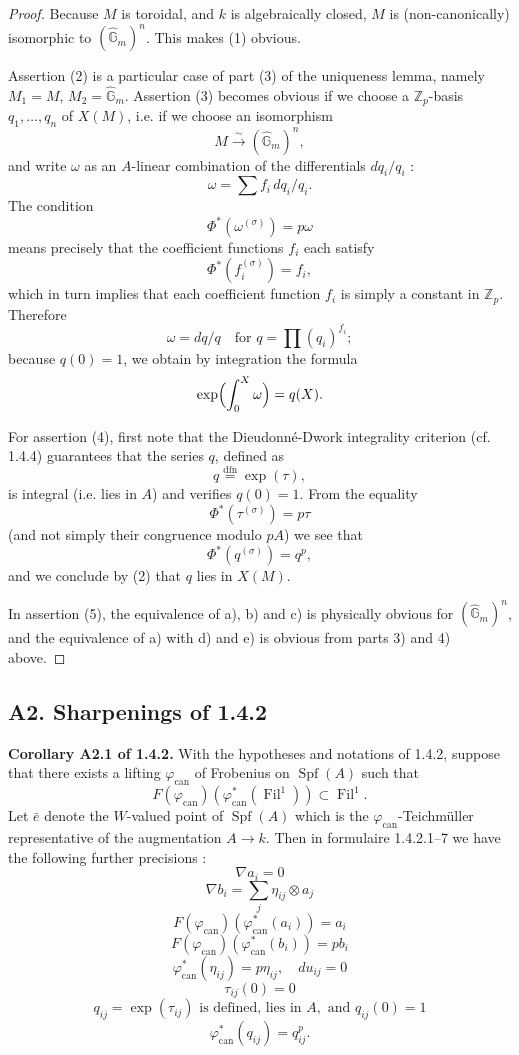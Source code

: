 \documentclass[12pt,a4paper]{article}
\theoremstyle{plain}
\theoremstyle{definition}
\theoremstyle{remark}
\DeclareMathOperator{\Fil}{Fil}
\DeclareMathOperator{\Spf}{Spf}
\begin{document}
\begin{proof}
Because $M$ is toroidal, and $k$ is algebraically closed, $M$ is (non-canonically) isomorphic to $(\hat{\mathbb{G}}_m)^n$. This makes (1) obvious.

Assertion (2) is a particular case of part (3) of the uniqueness lemma, namely $M_1 = M$, $M_2 = \hat{\mathbb{G}}_m$. Assertion (3) becomes obvious if we choose a $\mathbb{Z}_p$-basis $q_1, \ldots, q_n$ of $X(M)$, i.e. if we choose an isomorphism
\[
M \xrightarrow{\sim} (\hat{\mathbb{G}}_m)^n,
\]
and write $\omega$ as an $A$-linear combination of the differentials $dq_i/q_i$ :
\[
\omega = \sum f_i \, dq_i/q_i.
\]
The condition
\[
\Phi^*(\omega^{(\sigma)}) = p\omega
\]
means precisely that the coefficient functions $f_i$ each satisfy
\[
\Phi^*(f_i^{(\sigma)}) = f_i,
\]
which in turn implies that each coefficient function $f_i$ is simply a constant in $\mathbb{Z}_p$. Therefore
\[
\omega = dq/q \quad \text{for } q = \prod (q_i)^{f_i};
\]
because $q(0) = 1$, we obtain by integration the formula
\[
\exp\Bigl(\int_0^X \omega\Bigr) = q(X).
\]

For assertion (4), first note that the Dieudonn\'e-Dwork integrality criterion (cf. 1.4.4) guarantees that the series $q$, defined as
\[
q \overset{\mathrm{dfn}}{=} \exp(\tau),
\]
is integral (i.e. lies in $A$) and verifies $q(0) = 1$. From the equality
\[
\Phi^*(\tau^{(\sigma)}) = p\tau
\]
(and not simply their congruence modulo $pA$) we see that
\[
\Phi^*(q^{(\sigma)}) = q^p,
\]
and we conclude by (2) that $q$ lies in $X(M)$.

In assertion (5), the equivalence of a), b) and c) is physically obvious for $(\hat{\mathbb{G}}_m)^n$, and the equivalence of a) with d) and e) is obvious from parts 3) and 4) above. \qedhere
\end{proof}

\subsection*{A2. Sharpenings of 1.4.2}

\textbf{Corollary A2.1 of 1.4.2.} With the hypotheses and notations of 1.4.2, suppose that there exists a lifting $\varphi_{\mathrm{can}}$ of Frobenius on $\Spf(A)$ such that
\[
F(\varphi_{\mathrm{can}})(\varphi_{\mathrm{can}}^*(\Fil^1)) \subset \Fil^1.
\]
Let $\bar{e}$ denote the $W$-valued point of $\Spf(A)$ which is the $\varphi_{\mathrm{can}}$-Teichm\"uller representative of the augmentation $A \to k$. Then in formulaire 1.4.2.1--7 we have the following further precisions :
\[
\nabla a_i = 0
\]
\[
\nabla b_i = \sum_j \eta_{ij} \otimes a_j
\]
\[
F(\varphi_{\mathrm{can}})(\varphi_{\mathrm{can}}^*(a_i)) = a_i
\]
\[
F(\varphi_{\mathrm{can}})(\varphi_{\mathrm{can}}^*(b_i)) = pb_i
\]
\[
\varphi_{\mathrm{can}}^*(\eta_{ij}) = p\eta_{ij}, \quad du_{ij} = 0
\]
\[
\tau_{ij}(0) = 0
\]
\[
q_{ij} = \exp(\tau_{ij}) \text{ is defined, lies in } A, \text{ and } q_{ij}(0) = 1
\]
\[
\varphi_{\mathrm{can}}^*(q_{ij}) = q_{ij}^p.
\]
\end{document}
